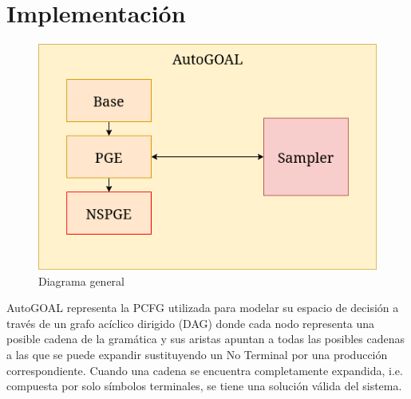 
\section{Implementaci\'on}

\begin{figure}[ht]
    \centering
    \includegraphics[scale=0.6]{Pictures/autogoal_impl.png}
    \caption{Diagrama general}
    \label{impl:fig:general_diagram}
\end{figure}


AutoGOAL representa la PCFG utilizada para modelar su espacio de decisi\'on a trav\'es de un grafo ac\'iclico dirigido (DAG) donde cada nodo representa una posible cadena de la gram\'atica y sus aristas apuntan a todas las posibles cadenas a las que se puede expandir sustituyendo un No Terminal por una producci\'on 
correspondiente. Cuando una cadena se encuentra completamente expandida, i.e. compuesta por solo s\'imbolos terminales, se tiene una soluci\'on v\'alida del sistema. 

